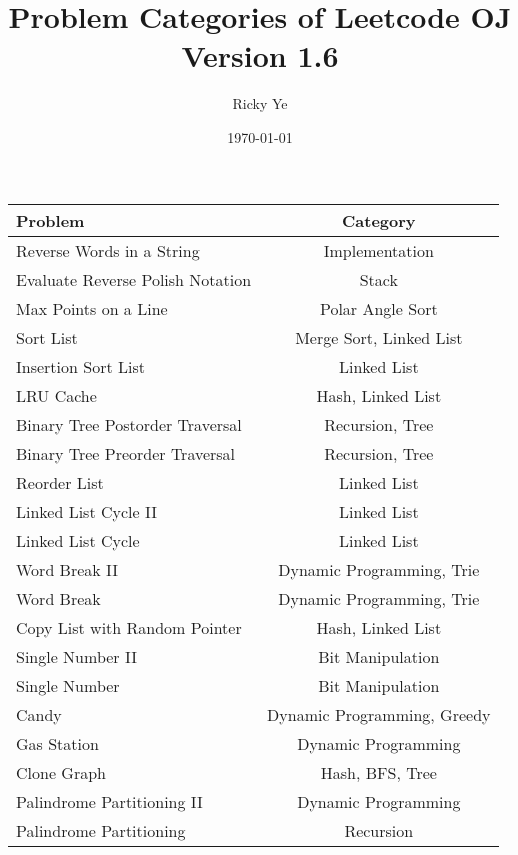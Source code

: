 \documentclass[paper=a4, fontsize=11pt]{scrartcl} %
\begin{document}
\title{Problem Categories of Leetcode OJ\\\textnormal{\small{Version 1.6}}}
\author{Ricky Ye}
\date{\today}
\maketitle

\setlength\parindent{0pt}
\small
\begin{center}
  \begin{longtable}{|l|c|}
    \hline
    \textbf{Problem}        &   \textbf{Category}    \\
    \hline
    Reverse Words in a String   &   Implementation  \\
    Evaluate Reverse Polish Notation    &   Stack   \\
    Max Points on a Line    &   Polar Angle Sort    \\
    Sort List   &   Merge Sort, Linked List \\
    Insertion Sort List &   Linked List \\
    LRU Cache   &   Hash, Linked List\\
    Binary Tree Postorder Traversal &   Recursion, Tree   \\
    Binary Tree Preorder Traversal  &   Recursion, Tree   \\
    Reorder List    &   Linked List \\
    Linked List Cycle II    &   Linked List \\
    Linked List Cycle   &   Linked List \\
    Word Break II   &   Dynamic Programming, Trie\\
    Word Break  &   Dynamic Programming, Trie\\
    Copy List with Random Pointer   &   Hash, Linked List\\
    Single Number II    &   Bit Manipulation    \\
    Single Number   &   Bit Manipulation    \\
    Candy   &    Dynamic Programming, Greedy\\
    Gas Station &   Dynamic Programming \\
    Clone Graph &   Hash, BFS, Tree \\
    Palindrome Partitioning II  &   Dynamic Programming \\
    Palindrome Partitioning &   Recursion   \\

\end{longtable}
\end{center}
\end{document}
